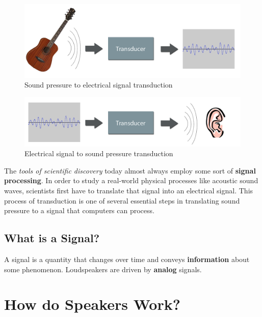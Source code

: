 \documentclass[11pt]{article}
\begin{document}
\begin{figure}[H]
   \centering
   \includegraphics[width=\textwidth]{images/TransductionDiag.png} 
   \caption{Sound pressure to electrical signal transduction}
   \label{fig:transduction1}
\end{figure}

\begin{figure}[H]
   \centering
   \includegraphics[width=\textwidth]{images/TransductionDiag2.png} 
   \caption{Electrical signal to sound pressure transduction}
   \label{fig:transduction2}
\end{figure}

The \emph{tools of scientific discovery} today almost always employ some sort of {\bf signal processing}. In order to study a real-world physical processes like acoustic sound waves, scientists first have to translate that signal into an electrical signal. This process of transduction is one of several essential steps in translating sound pressure to a signal that computers can process.

\subsection*{What is a Signal?}

A signal is a quantity that changes over time and conveys {\bf information} about some phenomenon. Loudspeakers are driven by {\bf analog} signals.


\section*{How do Speakers Work?}			%
\end{document}
